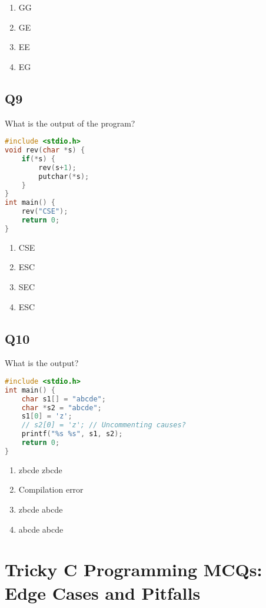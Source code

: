 \begin{enumerate}[label=(\alph*)]
    \item GG  
    \item GE  
    \item EE  
    \item EG
\end{enumerate}

\newpage
\subsection*{Q9}
What is the output of the program?
\begin{lstlisting}[language=C]
#include <stdio.h>
void rev(char *s) {
    if(*s) {
        rev(s+1);
        putchar(*s);
    }
}
int main() {
    rev("CSE");
    return 0;
}
\end{lstlisting}

\begin{enumerate}[label=(\alph*)]
    \item CSE  
    \item ESC  
    \item SEC  
    \item ESC
\end{enumerate}

\subsection*{Q10}
What is the output?
\begin{lstlisting}[language=C]
#include <stdio.h>
int main() {
    char s1[] = "abcde";
    char *s2 = "abcde";
    s1[0] = 'z';
    // s2[0] = 'z'; // Uncommenting causes?
    printf("%s %s", s1, s2);
    return 0;
}
\end{lstlisting}

\begin{enumerate}[label=(\alph*)]
    \item zbcde zbcde  
    \item Compilation error  
    \item zbcde abcde  
    \item abcde abcde
\end{enumerate}

\newpage
\section[Tricky C Programming MCQs: Edge Cases and Pitfalls]
{Tricky C Programming MCQs:\\ Edge Cases and Pitfalls}

